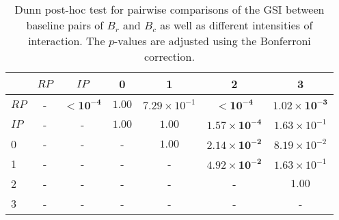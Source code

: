 \begin{table}
\centering
\caption{Dunn post-hoc test for pairwise comparisons of the GSI between baseline pairs of $B_r$ and $B_c$ as well as different intensities of interaction. The $p$-values are adjusted using the Bonferroni correction.}
\label{tab:dunn_gsi}
\begin{tabular}{lcccccc}
\toprule
 & $RP$ & $IP$ & 0 & 1 & 2 & 3 \\
\midrule
$RP$ & - & $\mathbf{< 10^{-4}}$ & $1.00$ & $7.29 \times 10^{-1}$ & $\mathbf{< 10^{-4}}$ & $\mathbf{1.02 \times 10^{-3}}$ \\
$IP$ & - & - & $1.00$ & $1.00$ & $\mathbf{1.57 \times 10^{-4}}$ & $1.63 \times 10^{-1}$ \\
0 & - & - & - & $1.00$ & $\mathbf{2.14 \times 10^{-2}}$ & $8.19 \times 10^{-2}$ \\
1 & - & - & - & - & $\mathbf{4.92 \times 10^{-2}}$ & $1.63 \times 10^{-1}$ \\
2 & - & - & - & - & - & $1.00$ \\
3 & - & - & - & - & - & - \\
\bottomrule
\end{tabular}
\end{table}
